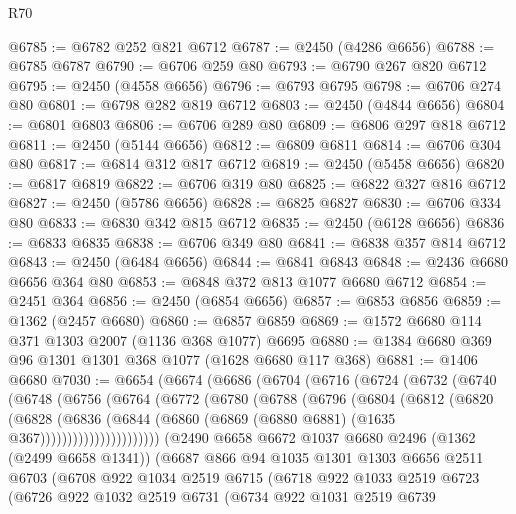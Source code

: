 \begin{lexlean}{R70}
\begin{coremodule}
@6785 := @6782 @252 @821 @6712
@6787 := @2450 (@4286 @6656)
@6788 := @6785 @6787
@6790 := @6706 @259 @80
@6793 := @6790 @267 @820 @6712
@6795 := @2450 (@4558 @6656)
@6796 := @6793 @6795
@6798 := @6706 @274 @80
@6801 := @6798 @282 @819 @6712
@6803 := @2450 (@4844 @6656)
@6804 := @6801 @6803
@6806 := @6706 @289 @80
@6809 := @6806 @297 @818 @6712
@6811 := @2450 (@5144 @6656)
@6812 := @6809 @6811
@6814 := @6706 @304 @80
@6817 := @6814 @312 @817 @6712
@6819 := @2450 (@5458 @6656)
@6820 := @6817 @6819
@6822 := @6706 @319 @80
@6825 := @6822 @327 @816 @6712
@6827 := @2450 (@5786 @6656)
@6828 := @6825 @6827
@6830 := @6706 @334 @80
@6833 := @6830 @342 @815 @6712
@6835 := @2450 (@6128 @6656)
@6836 := @6833 @6835
@6838 := @6706 @349 @80
@6841 := @6838 @357 @814 @6712
@6843 := @2450 (@6484 @6656)
@6844 := @6841 @6843
@6848 := @2436 @6680 @6656 @364 @80
@6853 := @6848 @372 @813 @1077 @6680 @6712
@6854 := @2451 @364
@6856 := @2450 (@6854 @6656)
@6857 := @6853 @6856
@6859 := @1362 (@2457 @6680)
@6860 := @6857 @6859
@6869 := @1572 @6680 @114 @371 @1303 @2007 (@1136 @368 @1077) @6695
@6880 := @1384 @6680 @369 @96 @1301 @1301 @368 @1077 (@1628 @6680 @117 @368)
@6881 := @1406 @6680
@7030 := @6654
    (@6674
      (@6686
        (@6704
          (@6716
            (@6724
              (@6732
                (@6740
                  (@6748
                    (@6756
                      (@6764
                        (@6772
                          (@6780
                            (@6788
                              (@6796
                                (@6804
                                  (@6812
                                    (@6820
                                      (@6828
                                        (@6836
                                          (@6844
                                            (@6860
                                              (@6869 (@6880 @6881) (@1635 @367))))))))))))))))))))))
      (@2490
        @6658
        @6672
        @1037
        @6680
        @2496
        (@1362 (@2499 @6658 @1341))
        (@6687
          @866
          @94
          @1035
          @1301
          @1303
          @6656
          @2511
          @6703
          (@6708
            @922
            @1034
            @2519
            @6715
            (@6718
              @922
              @1033
              @2519
              @6723
              (@6726
                @922
                @1032
                @2519
                @6731
                (@6734
                  @922
                  @1031
                  @2519
                  @6739

\end{coremodule}
\end{lexlean}
